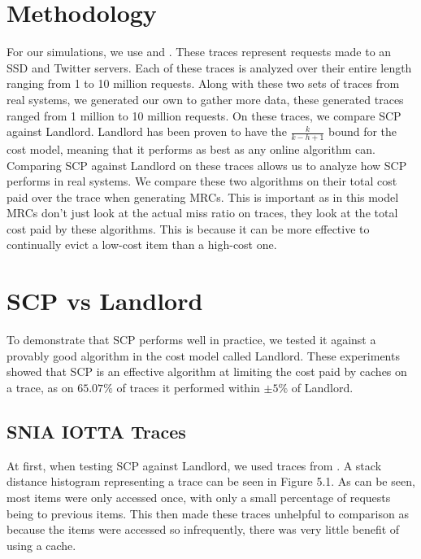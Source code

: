 



\section{Methodology}
For our simulations, we use \cite{snia-trace-block-io-28571} and \cite{cacheWorkload-OSDI20}. These traces represent requests made to an SSD and Twitter servers. Each of these traces is analyzed over their entire length ranging from 1 to 10 million requests. Along with these two sets of traces from real systems, we generated our own to gather more data, these generated traces ranged from 1 million to 10 million requests.
On these traces, we compare SCP against Landlord. Landlord has been proven to have the $\frac{k}{k-h+1}$ bound for the cost model, meaning that it performs as best as any online algorithm can. Comparing SCP against Landlord on these traces allows us to analyze how SCP performs in real systems. We compare these two algorithms on their total cost paid over the trace when generating MRCs. This is important as in this model MRCs don't just look at the actual miss ratio on traces, they look at the total cost paid by these algorithms. This is because it can be more effective to continually evict a low-cost item than a high-cost one.

\section{SCP vs Landlord}
To demonstrate that SCP performs well in practice, we tested it against a provably good algorithm in the cost model called Landlord. These experiments showed that SCP is an effective algorithm at limiting the cost paid by caches on a trace, as on $65.07\%$ of traces it performed within $\pm 5\%$ of Landlord. 

\subsection{SNIA IOTTA Traces}
At first, when testing SCP against Landlord, we used traces from \cite{snia-trace-block-io-28571}. A stack distance histogram representing a trace can be seen in Figure 5.1. As can be seen, most items were only accessed once, with only a small percentage of requests being to previous items. This then made these traces unhelpful to comparison as because the items were accessed so infrequently, there was very little benefit of using a cache.

